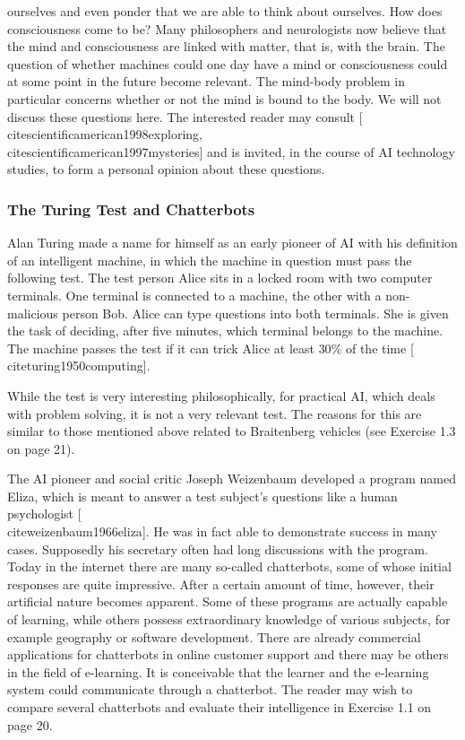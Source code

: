 \documentclass[10pt]{book}
\begin{document}
ourselves and even ponder that we are able to think about ourselves. How does consciousness come to be? Many philosophers and neurologists now believe that the mind and consciousness are linked with matter, that is, with the brain. The\\[0pt]
question of whether machines could one day have a mind or consciousness could at some point in the future become relevant. The mind-body problem in particular concerns whether or not the mind is bound to the body. We will not discuss these questions here. The interested reader may consult [\\cite{scientificamerican1998exploring}, \\cite{scientificamerican1997mysteries}] and is invited, in the course of AI technology studies, to form a personal opinion about these questions.


\subsubsection*{The Turing Test and Chatterbots}
Alan Turing made a name for himself as an early pioneer of AI with his definition of an intelligent machine, in which the machine in question must pass the following test. The test person Alice sits in a locked room with two computer terminals. One terminal is connected to a machine, the other with a non-malicious person Bob. Alice can type questions into both terminals. She is given the task of deciding, after five minutes, which terminal belongs to the machine. The machine passes the test if it can trick Alice at least $30 \%$ of the time [\\cite{turing1950computing}].

While the test is very interesting philosophically, for practical AI, which deals with problem solving, it is not a very relevant test. The reasons for this are similar to those mentioned above related to Braitenberg vehicles (see Exercise 1.3 on page 21).

The AI pioneer and social critic Joseph Weizenbaum developed a program named Eliza, which is meant to answer a test subject's questions like a human psychologist [\\cite{weizenbaum1966eliza}]. He was in fact able to demonstrate success in many cases. Supposedly his secretary often had long discussions with the program. Today in the internet there are many so-called chatterbots, some of whose initial responses are quite impressive. After a certain amount of time, however, their artificial nature becomes apparent. Some of these programs are actually capable of learning, while others possess extraordinary knowledge of various subjects, for example geography or software development. There are already commercial applications for chatterbots in online customer support and there may be others in the field of e-learning. It is conceivable that the learner and the e-learning system could communicate through a chatterbot. The reader may wish to compare several chatterbots and evaluate their intelligence in Exercise 1.1 on page 20.
\end{document}
